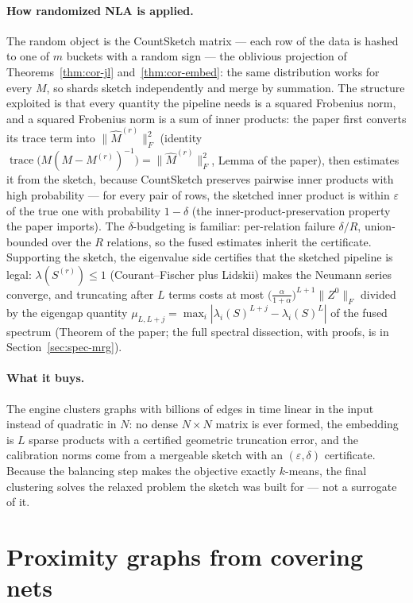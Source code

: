 \paragraph{How randomized NLA is applied.}
The random object is the CountSketch matrix --- each row of the data is
hashed to one of $m$ buckets with a random sign --- the oblivious
projection of Theorems~\ref{thm:cor-jl} and~\ref{thm:cor-embed}: the
same distribution works for every $M$, so shards sketch independently
and merge by summation. The structure exploited is that every quantity
the pipeline needs is a squared Frobenius norm, and a squared Frobenius
norm is a sum of inner products: the paper first converts its trace
term into $\|\hat{M}^{(r)}\|_F^2$ (identity
$\operatorname{trace}\bigl(M(M-M^{(r)})^{-1}\bigr) =
\|\hat{M}^{(r)}\|_F^2$, Lemma of the paper), then estimates it from
the sketch, because CountSketch preserves pairwise inner products with
high probability --- for every pair of rows, the sketched inner product
is within $\varepsilon$ of the true one with probability $1-\delta$
(the inner-product-preservation property the paper imports). The
$\delta$-budgeting is familiar: per-relation failure $\delta/R$,
union-bounded over the $R$ relations, so the fused estimates inherit
the certificate. Supporting the sketch, the eigenvalue side certifies
that the sketched pipeline is legal: $\lambda(S^{(r)}) \le 1$
(Courant--Fischer plus Lidskii) makes the Neumann series converge, and
truncating after $L$ terms costs at most $\bigl(\tfrac{\alpha}{1+
\alpha}\bigr)^{L+1} \|Z^0\|_F$ divided by the eigengap quantity
$\mu_{L,L+j} = \max_i |\lambda_i(S)^{L+j} - \lambda_i(S)^{L}|$ of the
fused spectrum (Theorem of the paper; the full spectral dissection,
with proofs, is in Section~\ref{sec:spec-mrg}).

\paragraph{What it buys.}
The engine clusters graphs with billions of edges in time linear in
the input instead of quadratic in $N$: no dense $N \times N$ matrix is
ever formed, the embedding is $L$ sparse products with a certified
geometric truncation error, and the calibration norms come from a
mergeable sketch with an $(\varepsilon,\delta)$ certificate. Because
the balancing step makes the objective exactly $k$-means, the final
clustering solves the relaxed problem the sketch was built for --- not
a surrogate of it.

\section{Proximity graphs from covering nets}
\label{sec:cor-pg}

